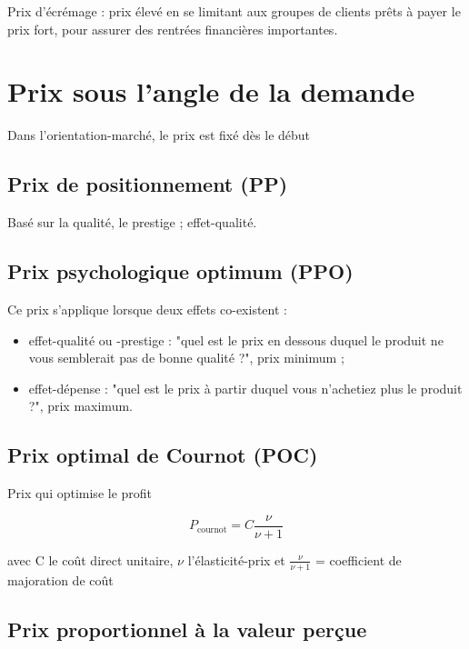 		Prix d'écrémage : prix élevé en se limitant aux groupes de clients prêts à payer le prix fort, pour assurer des rentrées financières importantes.
	
	\section{Prix sous l'angle de la demande}

	Dans l'orientation-marché, le prix est fixé dès le début
	

	
		\subsection{Prix de positionnement (PP)}
		
		Basé sur la qualité, le prestige ; effet-qualité.
		
		
		\subsection{Prix psychologique optimum (PPO)}
		
		Ce prix s'applique lorsque deux effets co-existent :
		
		\begin{itemize}
			\item effet-qualité ou -prestige : "quel est le prix en dessous duquel le produit ne vous semblerait pas de bonne qualité ?", prix minimum ;
			\item effet-dépense : "quel est le prix à partir duquel vous n'achetiez plus le produit ?", prix maximum.
		\end{itemize}
		
		\subsection{Prix optimal de Cournot (POC)}
		
		Prix qui optimise le profit
		
		$$P_{\text{cournot}} = C \frac{\nu}{\nu + 1}$$
		
		avec C le coût direct unitaire, $\nu$ l'élasticité-prix et $ \frac{\nu}{\nu +1 } $ = coefficient de majoration de coût
		
		
		\subsection{Prix proportionnel à la valeur perçue}
		
